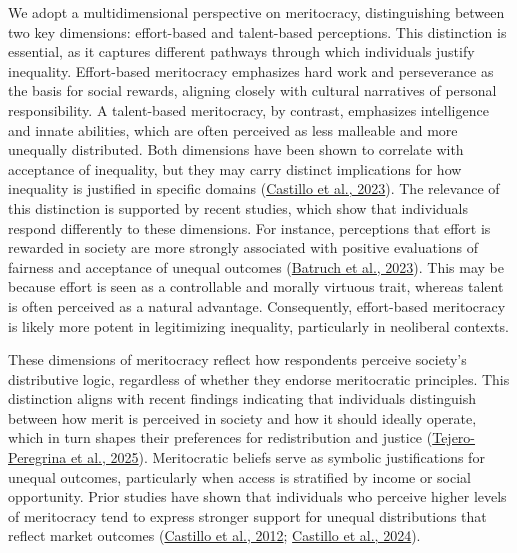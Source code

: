 \documentclass[
  12pt,
]{article}
\begin{document}
We adopt a multidimensional perspective on meritocracy, distinguishing
between two key dimensions: effort-based and talent-based perceptions.
This distinction is essential, as it captures different pathways through
which individuals justify inequality. Effort-based meritocracy
emphasizes hard work and perseverance as the basis for social rewards,
aligning closely with cultural narratives of personal responsibility. A
talent-based meritocracy, by contrast, emphasizes intelligence and
innate abilities, which are often perceived as less malleable and more
unequally distributed. Both dimensions have been shown to correlate with
acceptance of inequality, but they may carry distinct implications for
how inequality is justified in specific domains
(\protect\hyperlink{ref-castillo_multidimensional_2023}{Castillo et al.,
2023}). The relevance of this distinction is supported by recent
studies, which show that individuals respond differently to these
dimensions. For instance, perceptions that effort is rewarded in society
are more strongly associated with positive evaluations of fairness and
acceptance of unequal outcomes
(\protect\hyperlink{ref-batruch_belief_2023}{Batruch et al., 2023}).
This may be because effort is seen as a controllable and morally
virtuous trait, whereas talent is often perceived as a natural
advantage. Consequently, effort-based meritocracy is likely more potent
in legitimizing inequality, particularly in neoliberal contexts.

These dimensions of meritocracy reflect how respondents perceive
society's distributive logic, regardless of whether they endorse
meritocratic principles. This distinction aligns with recent findings
indicating that individuals distinguish between how merit is perceived
in society and how it should ideally operate, which in turn shapes their
preferences for redistribution and justice
(\protect\hyperlink{ref-tejero-peregrina_perceived_2025}{Tejero-Peregrina
et al., 2025}). Meritocratic beliefs serve as symbolic justifications
for unequal outcomes, particularly when access is stratified by income
or social opportunity. Prior studies have shown that individuals who
perceive higher levels of meritocracy tend to express stronger support
for unequal distributions that reflect market outcomes
(\protect\hyperlink{ref-castillo_percepcion_2019}{Castillo et al.,
2012}; \protect\hyperlink{ref-castillo_socialization_2024}{Castillo et
al., 2024}).
\end{document}
